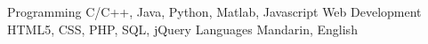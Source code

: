 \begin{cvskills}
    \cvskill
    {Programming}
    {C/C++, Java, Python, Matlab, Javascript}
    \cvskill
    {Web Development}
    {HTML5, CSS, PHP, SQL, jQuery}
    \cvskill
    {Languages}
    {Mandarin, English}
\end{cvskills}
